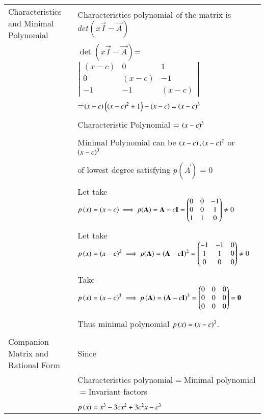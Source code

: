 \begin{longtable}{|l|l|}
\multirow{3}{*}{Characteristics and Minimal Polynomial} & \\
&
Characteristics polynomial of the matrix  is $det(x\vec{I}-\vec{A})$\\ 
&\\
& $\det(x\vec{I}-\vec{A})$= $\left|
                \begin{array}{ccc}
                (x-c) & 0 & 1\\
                0 & (x-c) & -1\\
                -1 & -1 & (x-c)
                \end{array} \right|$\\ &=$\left(x-c\right)\left(\left(x-c\right)^2+1\right)-\left(x-c\right)=\left(x-c\right)^3$\\
&\\
& Characteristic Polynomial = $\left(x-c\right)^3$\\
&\\
& Minimal Polynomial can be $\left(x-c\right),\left(x-c\right)^2$ or $\left(x-c\right)^3$ \\
&\\
&of lowest degree satisfying $p(\vec{A})=0$    \\
&\\
&Let take $p\left(x\right)=\left(x-c\right)\implies p(\mathbf{A})=\mathbf{A}-c\mathbf{I}=\begin{pmatrix}0&0&-1\\0&0&1\\1&1&0\end{pmatrix}\neq0$\\
&\\
&Let take $p\left(x\right)=\left(x-c\right)^2\implies p(\mathbf{A})=\left(\mathbf{A}-c\mathbf{I}\right)^2=\begin{pmatrix}-1&-1&0\\1&1&0\\0&0&0\end{pmatrix}\neq0$\\
&\\
&Take $p\left(x\right)=\left(x-c\right)^3\implies p\left(\mathbf{A}\right) =\left(\mathbf{A}-c\mathbf{I}\right)^3=\begin{pmatrix}0&0&0\\0&0&0\\0&0&0\end{pmatrix}=\mathbf{0}$\\
&\\
&Thus minimal polynomial $p\left(x\right)=\left(x-c\right)^3$.\\  
&\\
\hline
\multirow{3}{*}{Companion Matrix and Rational Form} & \\
&Since\\
&\\
&Characteristics polynomial$=$Minimal polynomial$=$Invariant factors\\
&\\
&$p\left(x\right)=x^3-3cx^2+3c^2x-c^3$\\

\end{longtable}
